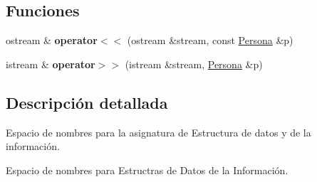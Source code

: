 \subsection*{Funciones}
\begin{DoxyCompactItemize}
\item 
\hypertarget{namespaceedi_ae9aeafbc9acc177b50a7a87088282c7f}{ostream \& {\bfseries operator$<$$<$} (ostream \&stream, const \hyperlink{classedi_1_1Persona}{Persona} \&p)}\label{namespaceedi_ae9aeafbc9acc177b50a7a87088282c7f}

\item 
\hypertarget{namespaceedi_abf0570023b58f2347a0649dafb96aeca}{istream \& {\bfseries operator$>$$>$} (istream \&stream, \hyperlink{classedi_1_1Persona}{Persona} \&p)}\label{namespaceedi_abf0570023b58f2347a0649dafb96aeca}

\end{DoxyCompactItemize}


\subsection{Descripción detallada}
Espacio de nombres para la asignatura de Estructura de datos y de la información. 

Espacio de nombres para Estructras de Datos de la Información. 